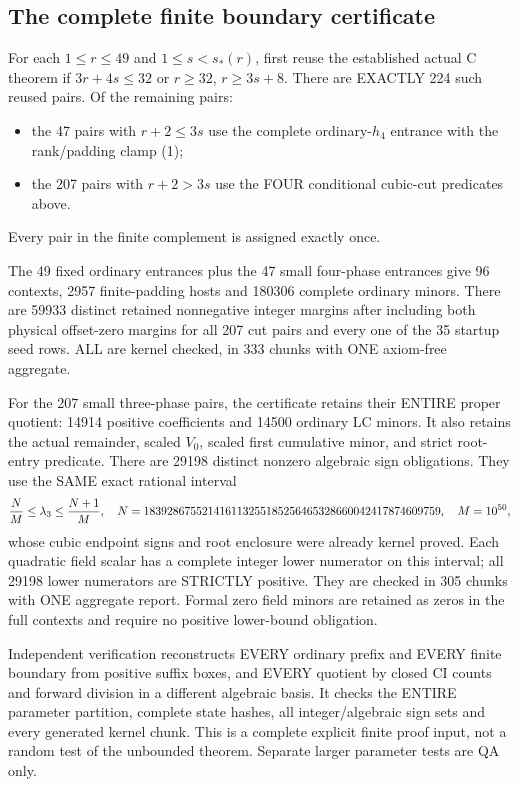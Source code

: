 \subsection{The complete finite boundary certificate}
For each $1\le r\le49$ and $1\le s<s_*(r)$, first reuse the established
actual C theorem if $3r+4s\le32$ or $r\ge32$, $r\ge3s+8$.
There are EXACTLY 224 such reused pairs.
Of the remaining pairs:
\begin{itemize}
\item the 47 pairs with $r+2\le3s$ use the complete ordinary-$h_4$
entrance with the rank/padding clamp (1);
\item the 207 pairs with $r+2>3s$ use the FOUR conditional cubic-cut
predicates above.
\end{itemize}
Every pair in the finite complement is assigned exactly once.

The 49 fixed ordinary entrances plus the 47 small four-phase entrances
give 96 contexts, 2957 finite-padding hosts and 180306 complete ordinary
minors. There are 59933 distinct retained nonnegative integer margins
after including both physical offset-zero margins for all 207 cut pairs
and every one of the 35 startup seed rows.
ALL are kernel checked, in 333 chunks with ONE axiom-free aggregate.

For the 207 small three-phase pairs, the certificate retains their
ENTIRE proper quotient: 14914 positive coefficients and 14500 ordinary
LC minors. It also retains the actual remainder, scaled $V_0$,
scaled first cumulative minor, and strict root-entry predicate.
There are 29198 distinct nonzero algebraic sign obligations.
They use the SAME exact rational interval
\[
 {N\over M}\le\lambda_3\le{N+1\over M},\quad
 N=183928675521416113255185256465328660042417874609759,
 \quad M=10^{50},
\]
whose cubic endpoint signs and root enclosure were already kernel
proved. Each quadratic field scalar has a complete integer lower
numerator on this interval; all 29198 lower numerators are STRICTLY
positive. They are checked in 305 chunks with ONE aggregate report.
Formal zero field minors are retained as zeros in the full contexts
and require no positive lower-bound obligation.

Independent verification reconstructs EVERY ordinary prefix and
EVERY finite boundary from positive suffix boxes, and EVERY quotient
by closed CI counts and forward division in a different algebraic
basis. It checks the ENTIRE parameter partition, complete state hashes,
all integer/algebraic sign sets and every generated kernel chunk.
This is a complete explicit finite proof input, not a random test of
the unbounded theorem. Separate larger parameter tests are QA only.

